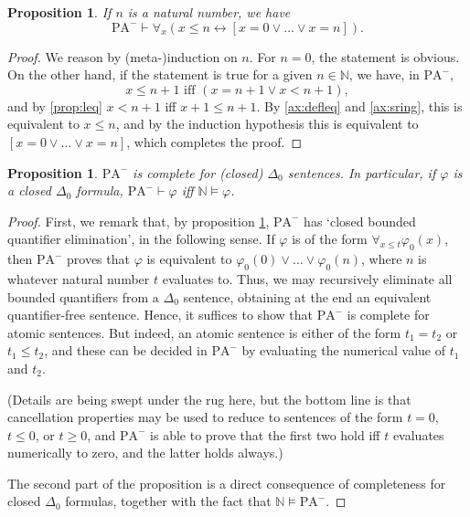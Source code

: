 \documentclass{article}
\newtheorem{prop}[theorem]{Proposition}
\theoremstyle{nonumberplain}
\newtheorem{proof}{Proof}
\newcommand{\N}{\mathbb{N}}
\newcommand{\PA}{\mathrm{PA}}
\newcommand{\WPA}{\PA^-}
\begin{document}
\begin{prop}\label{prop:leqrep}
If $n$ is a natural number, we have
\begin{equation}
\WPA \vdash \forall_x (x \leq n \leftrightarrow [x = 0 \lor \dots \lor x = n]).
\end{equation}
\end{prop}

\begin{proof}
We reason by (meta-)induction on $n$. For $n = 0$, the statement is obvious. On the other hand, if the statement is true for a given $n \in \N$, we have, in $\WPA$,
\begin{equation}
x \leq n+1 \text{ iff } (x = n+1 \lor x < n+1),
\end{equation}
and by \eqref{prop:leq} $x < n+1$ iff $x+1 \leq n+1$. By \eqref{ax:defleq} and \eqref{ax:sring}, this is equivalent to $x \leq n$, and by the induction hypothesis this is equivalent to $[x=0 \lor \dots \lor x=n]$, which completes the proof.
\end{proof}

\begin{prop}\label{prop:wpadelta0}
$\WPA$ is complete for (closed) $\Delta_0$ sentences. In particular, if $\varphi$ is a closed $\Delta_0$ formula, $\WPA \vdash \varphi$ iff $\N \vDash \varphi$.
\end{prop}

\begin{proof}
First, we remark that, by proposition \ref{prop:leqrep}, $\WPA$ has `closed bounded quantifier elimination', in the following sense. If $\varphi$ is of the form $\forall_{x \leq t} \varphi_0(x)$, then $\WPA$ proves that $\varphi$ is equivalent to $\varphi_0(0) \lor \dots \lor \varphi_0(n)$, where $n$ is whatever natural number $t$ evaluates to. Thus, we may recursively eliminate all bounded quantifiers from a $\Delta_0$ sentence, obtaining at the end an equivalent quantifier-free sentence. Hence, it suffices to show that $\WPA$ is complete for atomic sentences. But indeed, an atomic sentence is either of the form $t_1 = t_2$ or $t_1 \leq t_2$, and these can be decided in $\WPA$ by evaluating the numerical value of $t_1$ and $t_2$.

(Details are being swept under the rug here, but the bottom line is that cancellation properties may be used to reduce to sentences of the form $t = 0$, $t \leq 0$, or $t \geq 0$, and $\WPA$ is able to prove that the first two hold iff $t$ evaluates numerically to zero, and the latter holds always.)

The second part of the proposition is a direct consequence of completeness for closed $\Delta_0$ formulas, together with the fact that $\N \vDash \WPA$.
\end{proof}
\end{document}
